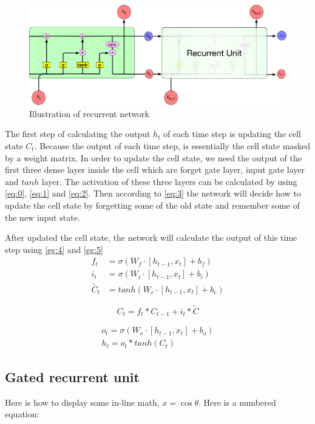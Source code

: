 \begin{figure}[h] 
	\centering
	\includegraphics[width=6.0in]{Figures/recurrent4}
	\caption[Box figure]{Illustration of recurrent network}
\end{figure}

The first step of calculating the output $h_t$ of each time step is updating the cell state $C_t$. Because the output of each time step, is essentially the cell state masked by a weight matrix. In order to update the cell state, we need the output of the first three dense layer inside the cell which are forget gate layer, input gate layer and $tanh$ layer. The activation of these three layers can be calculated by using \ref{eq:0}, \ref{eq:1} and \ref{eq:2}. Then according to  \ref{eq:3} the network will decide how to update the cell state by forgetting some of the old state and remember some of the new input state.\par
After updated the cell state, the network will calculate the output of this time step using \ref{eg:4} and \ref{eg:5}
\begin{subequations} 
    \begin{align}
    	f_{ t }&=\sigma (W_{ f }\cdot [h_{t-1} , x_t] +b_f) \label{eq:0}\\	
        i_t &= \sigma(W_i \cdot[h_{t-1}, x_t] + b_i)\label{eq:1}\\
        \tilde {  {C _t } } &= tanh(W_c\cdot [h_{t-1}, x_t]+ b_c) \label{eq:2}
    \end{align}	
\end{subequations}




\begin{equation} \label{eq:3}
    C_t = f_t\ast C_{t-1} +i_t\ast \tilde{C}
\end{equation}

\begin{subequations}
    \begin{align}
        o_t = \sigma(W_o\cdot [h_{t-1}, x_t] +b_o) \label{eg:4}\\
        h_t = o_t \ast tanh(C_t) \label{eg:5}
    \end{align}
\end{subequations}

\par
\subsection{Gated recurrent unit}
\par
Here is how to display some in-line math, $x=\cos\theta$. Here is a numbered equation:
